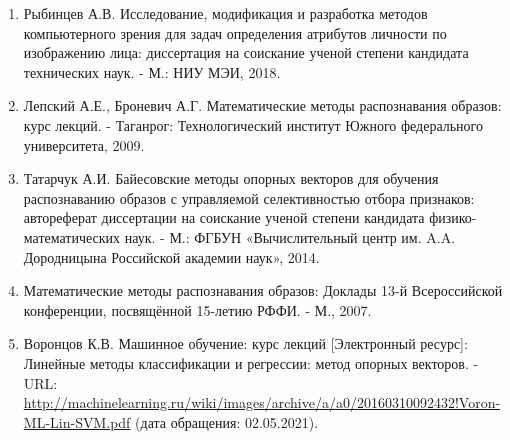 \documentclass[12pt,a4paper]{article}
\begin{document}
\begin{enumerate}
    \item Рыбинцев А.В. Исследование, модификация и разработка методов компьютерного зрения для задач определения атрибутов личности по изображению лица: диссертация на соискание ученой степени кандидата технических наук. - М.: НИУ МЭИ, 2018.
    \item Лепский А.Е., Броневич А.Г. Математические методы распознавания образов: курс лекций. - Таганрог: Технологический институт Южного федерального университета, 2009.
    \item Татарчук А.И. Байесовские методы опорных векторов для обучения распознаванию образов с управляемой селективностью отбора признаков: автореферат диссертации на соискание ученой степени кандидата физико-математических наук. - М.: ФГБУН «Вычислительный центр им. A.A. Дородницына Российской академии наук», 2014.
    \item Математические методы распознавания образов: Доклады 13-й Всероссийской конференции, посвящённой 15-летию РФФИ. - М., 2007.
    \item Воронцов К.В. Машинное обучение: курс лекций [Электронный ресурс]: Линейные методы классификации и регрессии: метод опорных векторов. - URL: \url{http://machinelearning.ru/wiki/images/archive/a/a0/20160310092432!Voron-ML-Lin-SVM.pdf} (дата обращения: 02.05.2021).
\end{enumerate}
\end{document}
